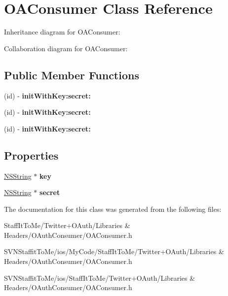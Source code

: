 \hypertarget{interface_o_a_consumer}{
\section{\-O\-A\-Consumer \-Class \-Reference}
\label{interface_o_a_consumer}
}


\-Inheritance diagram for \-O\-A\-Consumer\-:


\-Collaboration diagram for \-O\-A\-Consumer\-:
\subsection*{\-Public \-Member \-Functions}
\begin{DoxyCompactItemize}
\item 
\hypertarget{interface_o_a_consumer_ab4be975e12c8e319ac6990be8346998d}{
(id) -\/ {\bfseries init\-With\-Key\-:secret\-:}}
\label{interface_o_a_consumer_ab4be975e12c8e319ac6990be8346998d}

\item 
\hypertarget{interface_o_a_consumer_ab4be975e12c8e319ac6990be8346998d}{
(id) -\/ {\bfseries init\-With\-Key\-:secret\-:}}
\label{interface_o_a_consumer_ab4be975e12c8e319ac6990be8346998d}

\item 
\hypertarget{interface_o_a_consumer_ab4be975e12c8e319ac6990be8346998d}{
(id) -\/ {\bfseries init\-With\-Key\-:secret\-:}}
\label{interface_o_a_consumer_ab4be975e12c8e319ac6990be8346998d}

\end{DoxyCompactItemize}
\subsection*{\-Properties}
\begin{DoxyCompactItemize}
\item 
\hypertarget{interface_o_a_consumer_add16b78ddef07c4ddd68b7e56a5f79b1}{
\hyperlink{class_n_s_string}{\-N\-S\-String} $\ast$ {\bfseries key}}
\label{interface_o_a_consumer_add16b78ddef07c4ddd68b7e56a5f79b1}

\item 
\hypertarget{interface_o_a_consumer_ad52803584a0eb69882a026d053115660}{
\hyperlink{class_n_s_string}{\-N\-S\-String} $\ast$ {\bfseries secret}}
\label{interface_o_a_consumer_ad52803584a0eb69882a026d053115660}

\end{DoxyCompactItemize}


\-The documentation for this class was generated from the following files\-:\begin{DoxyCompactItemize}
\item 
\-Staff\-It\-To\-Me/\-Twitter+\-O\-Auth/\-Libraries \& Headers/\-O\-Auth\-Consumer/\-O\-A\-Consumer.\-h\item 
\-S\-V\-N\-Staffit\-To\-Me/ios/\-My\-Code/\-Staff\-It\-To\-Me/\-Twitter+\-O\-Auth/\-Libraries \& Headers/\-O\-Auth\-Consumer/\-O\-A\-Consumer.\-h\item 
\-S\-V\-N\-Staffit\-To\-Me/ios/\-Staff\-It\-To\-Me/\-Twitter+\-O\-Auth/\-Libraries \& Headers/\-O\-Auth\-Consumer/\-O\-A\-Consumer.\-h\end{DoxyCompactItemize}
